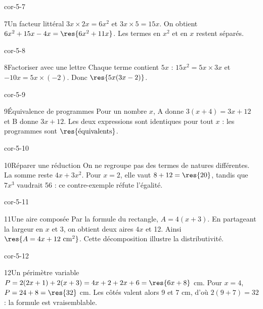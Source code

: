 \begin{blocLivre}{cor-5-7}\begin{corrige}{7}{Un facteur littéral}
$3x\times2x=6x^2$ et $3x\times5=15x$. On obtient $6x^2+15x-4x=\res{6x^2+11x}$. Les termes en $x^2$ et en $x$ restent séparés.
\end{corrige}\end{blocLivre}
\begin{blocLivre}{cor-5-8}\begin{corrige}{8}{Factoriser avec une lettre}
Chaque terme contient $5x$ : $15x^2=5x\times3x$ et $-10x=5x\times(-2)$. Donc $\res{5x(3x-2)}$.
\end{corrige}\end{blocLivre}
\begin{blocLivre}{cor-5-9}\begin{corrige}{9}{Équivalence de programmes}
Pour un nombre $x$, A donne $3(x+4)=3x+12$ et B donne $3x+12$. Les deux expressions sont identiques pour tout $x$ : les programmes sont $\res{\text{équivalents}}$.
\end{corrige}\end{blocLivre}
\begin{blocLivre}{cor-5-10}\begin{corrige}{10}{Réparer une réduction}
On ne regroupe pas des termes de natures différentes. La somme reste $4x+3x^2$. Pour $x=2$, elle vaut $8+12=\res{20}$, tandis que $7x^3$ vaudrait 56 : ce contre-exemple réfute l’égalité.
\end{corrige}\end{blocLivre}
\begin{blocLivre}{cor-5-11}\begin{corrige}{11}{Une aire composée}
Par la formule du rectangle, $A=4(x+3)$. En partageant la largeur en $x$ et 3, on obtient deux aires $4x$ et 12. Ainsi $\res{A=4x+12\ \mathrm{cm}^2}$. Cette décomposition illustre la distributivité.
\label{fig-cor-5-11}
\end{corrige}\end{blocLivre}
\begin{blocLivre}{cor-5-12}\begin{corrige}{12}{Un périmètre variable}
$P=2(2x+1)+2(x+3)=4x+2+2x+6=\res{6x+8}$ cm. Pour $x=4$, $P=24+8=\res{32}$ cm. Les côtés valent alors 9 et 7 cm, d’où $2(9+7)=32$ : la formule est vraisemblable.
\label{fig-cor-5-12}
\end{corrige}\end{blocLivre}
